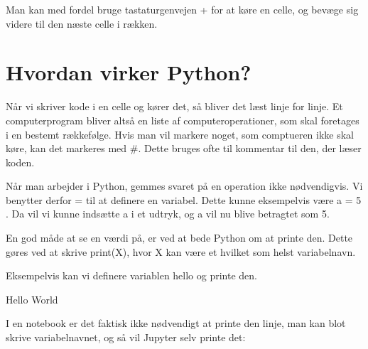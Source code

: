 \documentclass[letterpaper,10pt,english]{jupyterBook}
\begin{document}
 Man kan med fordel bruge tastaturgenvejen  +  for at køre en celle, og bevæge sig videre til den næste celle i rækken.


\section{Hvordan virker Python?}
\label{\detokenize{notebooks/Basal_python:hvordan-virker-python}}
Når  vi skriver kode i en celle og kører det, så bliver det læst linje for linje. Et computerprogram bliver altså en liste af computer\sphinxhyphen{}operationer, som skal foretages i en bestemt rækkefølge. Hvis man vil markere noget, som comptueren ikke skal køre, kan det markeres med \#. Dette bruges ofte til kommentar til den, der læser koden.

Når man arbejder i Python, gemmes svaret på en operation ikke nødvendigvis. Vi benytter derfor  =  til at definere en variabel. Dette kunne eksempelvis være  a = 5 . Da vil vi kunne indsætte a i et udtryk, og a vil nu blive betragtet som 5.

En god måde at se en værdi på, er ved at bede Python om at printe den. Dette gøres ved at skrive print(X), hvor X kan være et hvilket som helst variabelnavn.

Eksempelvis kan vi definere variablen hello og printe den.

\begin{sphinxVerbatim}[commandchars=\\\{\}]
   
\end{sphinxVerbatim}

\begin{sphinxVerbatim}[commandchars=\\\{\}]
Hello World
\end{sphinxVerbatim}

I en notebook er det faktisk ikke nødvendigt at printe den  linje, man kan blot skrive variabelnavnet, og så vil Jupyter selv printe det:

\begin{sphinxVerbatim}[commandchars=\\\{\}]
\end{sphinxVerbatim}
\end{document}
